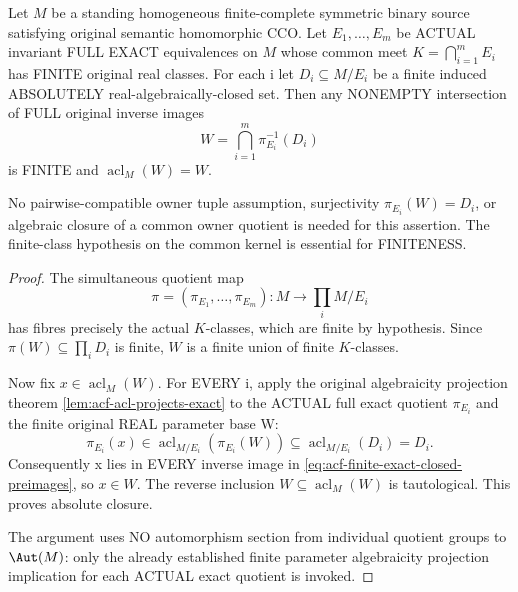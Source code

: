 \begin{lemma}
\label{lem:acf-finite-exact-closed-preimages}
Let $M$ be a standing homogeneous
finite-complete symmetric binary
source satisfying original semantic
homomorphic CCO. Let
$E_1,\ldots,E_m$ be ACTUAL
invariant FULL EXACT
equivalences on $M$ whose
common meet
$K=\bigcap_{i=1}^m E_i$
has FINITE original real
classes. For each i let
$D_i\subseteq M/E_i$ be
a finite induced ABSOLUTELY
real-algebraically-closed
set. Then any NONEMPTY
intersection of FULL
original inverse images
\[
          W=\bigcap_{i=1}^m
                  \pi_{E_i}^{-1}(D_i)
\tag{FPCL}\label{eq:acf-finite-exact-closed-preimages}
\]
is FINITE and
$\operatorname{acl}_M(W)=W$.

No pairwise-compatible owner
tuple assumption, surjectivity
$\pi_{E_i}(W)=D_i$, or
algebraic closure of a
common owner quotient is
needed for this assertion.
The finite-class hypothesis
on the common kernel is
essential for FINITENESS.
\end{lemma}
\begin{proof}
The simultaneous quotient
map
\[
     \pi=(\pi_{E_1},\ldots,
               \pi_{E_m}):
               M\longrightarrow
                  \prod_i M/E_i
\]
has fibres precisely the
actual $K$-classes, which
are finite by hypothesis.
Since $\pi(W)\subseteq
\prod_iD_i$ is finite,
$W$ is a finite union of
finite $K$-classes.

Now fix
$x\in\operatorname{acl}_M(W)$.
For EVERY i, apply the
original algebraicity
projection theorem
\cref{lem:acf-acl-projects-exact}
to the ACTUAL full exact
quotient $\pi_{E_i}$ and
the finite original REAL
parameter base W:
\[
  \pi_{E_i}(x)\in
  \operatorname{acl}_{M/E_i}
             (\pi_{E_i}(W))
 \subseteq
  \operatorname{acl}_{M/E_i}(D_i)
              =D_i .
\]
Consequently x lies in
EVERY inverse image in
\eqref{eq:acf-finite-exact-closed-preimages},
so $x\in W$. The reverse
inclusion $W\subseteq
\operatorname{acl}_M(W)$
is tautological. This
proves absolute closure.

The argument uses NO
automorphism section from
individual quotient groups
to $\Aut(M)$: only the
already established finite
parameter algebraicity
projection implication
for each ACTUAL exact
quotient is invoked.
\end{proof}

